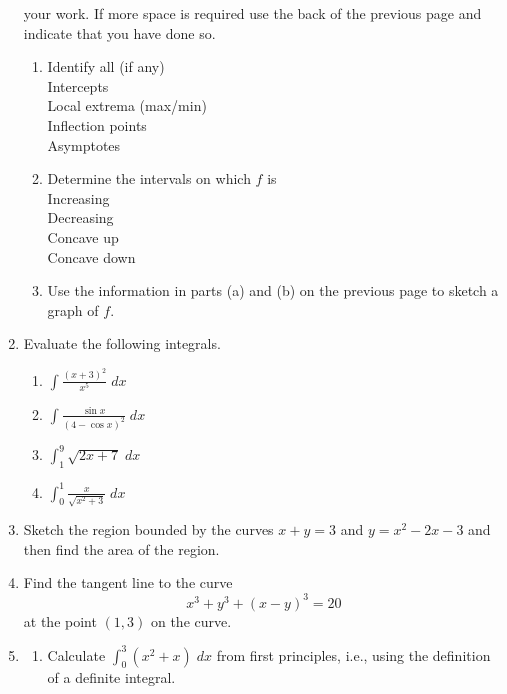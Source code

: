 \documentclass[12pt]{article}
\newcommand{\ds}{\displaystyle}
\begin{document}
\begin{enumerate}
  your work.  If more space is required use the back of the previous page
  and indicate that you have done so.
  \begin{enumerate}
  \item Identify all (if any)\\
    Intercepts \hrulefill\\
    Local extrema (max/min) \hrulefill\\
    Inflection points \hrulefill\\
    Asymptotes \hrulefill
  \item Determine the intervals on which $f$ is\\
    Increasing \hrulefill\\
    Decreasing \hrulefill\\
    Concave up \hrulefill\\
    Concave down \hrulefill\\
\vfill
\newpage
  \item Use the information in parts (a) and (b) on the previous page to
    sketch a graph of $f$.
  \end{enumerate}
\vfill
\newpage
\item Evaluate
  the following integrals.
  \begin{enumerate}
  \item $\ds \int\frac{(x+3)^2}{x^5} \; dx$
\vfill
  \item $\ds \int\frac{\sin x}{(4-\cos x)^2} \; dx$
\vfill
  \item $\ds \int_1^9 \sqrt{2x+7} \; dx$
\vfill
  \item $\ds \int_0^{1} \frac{x}{\sqrt{x^2+3}} \; dx$
\vfill
  \end{enumerate}
\newpage
\item Sketch 
  the region bounded by the curves $x+y=3$ and $y=x^2-2x-3$ and then
  find the area of the region.
\vfill
\newpage
\item Find 
  the tangent line to the curve
  \begin{displaymath}
    x^3+y^3+(x-y)^3=20
  \end{displaymath}
  at the point $(1,3)$ on the curve.
\vfill
\newpage
\item 
  \begin{enumerate}
  \item Calculate 
    $\ds\int_0^3 (x^2+x) \; dx$ from first principles, i.e., using
    the definition of a definite integral.

\end{enumerate}
\end{enumerate}
\end{document}
